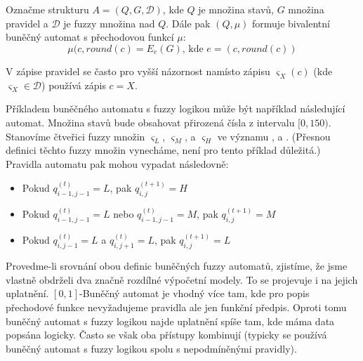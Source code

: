\documentclass[a4paper,10pt]{article}
\begin{document}
\begin{definition}
  Označme strukturu $A = (Q, G, \mathcal{D})$, kde $Q$ je množina stavů, $G$ množina  pravidel a $\mathcal{D}$ je fuzzy množina nad $Q$. Dále pak $(Q, \mu)$ formuje bivalentní buněčný automat s přechodovou funkcí $\mu$:
  $$
    \mu(c, round(c) = E_e(G) \text{, kde $e = (c, round(c))$}
  $$
  
\end{definition}

\begin{notation*}
  V zápise pravidel se často pro vyšší názornost namísto zápisu $\varsigma_X(c)$ (kde $\varsigma_X \in \mathcal{D}$) používá zápis $c = X$. 
\end{notation*}

\begin{example}
 Příkladem buněčného automatu s fuzzy logikou může být například následující automat. Množina stavů bude obsahovat přirozená čísla z intervalu $[0, 150)$. Stanovíme čtveřici fuzzy množin $\varsigma_L$, $\varsigma_M$, a $\varsigma_H$ ve významu ,  a . (Přesnou definici těchto fuzzy množin vynecháme, není pro tento příklad důležitá.) Pravidla automatu pak mohou vypadat následovně:
 \begin{itemize}
  \item Pokud $q^{(t)}_{i-1,j-1} = L$, pak $q^{(t+1)}_{i,j} = H$
  \item Pokud $q^{(t)}_{i-1,j-1} = L$ nebo $q^{(t)}_{i-1,j-1} = M$, pak $q^{(t+1)}_{i,j} = M$
  \item Pokud $q^{(t)}_{i,j-1} = L$ a $q^{(t)}_{i,j+1} = L$, pak $q^{(t+1)}_{i,j} = L$
 \end{itemize}
\end{example}


Provedme-li srovnání obou definic buněčných fuzzy automatů, zjistíme, že jsme vlastně obdrželi dva značně rozdílné výpočetní modely. To se projevuje i na jejich uplatnění. $[0,1]$-Buněčný automat je vhodný více tam, kde pro popis přechodové funkce nevyžadujeme  pravidla ale jen funkční předpis. Oproti tomu buněčný automat s fuzzy logikou najde uplatnění spíše tam, kde máma data popsána logicky. Často se však oba přístupy kombinují (typicky se používá buněčný automat s fuzzy logikou spolu s nepodmíněnými pravidly). 
\end{document}
